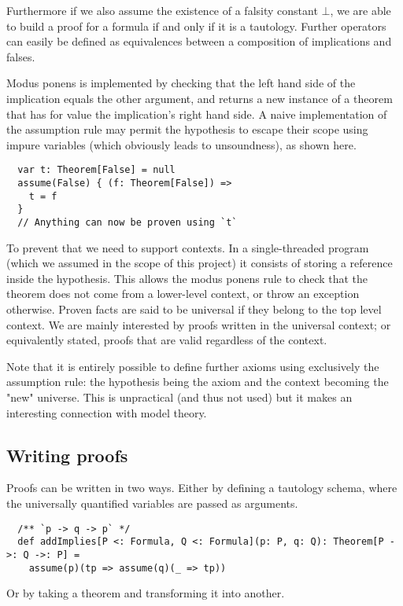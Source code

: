 \documentclass[acmlarge]{acmart}
\begin{document}
Furthermore if we also assume the existence of a falsity constant $\bot$, we are able to build a proof for a formula if and only if it is a tautology. Further operators can easily be defined as equivalences between a composition of implications and falses.

Modus ponens is implemented by checking that the left hand side of the implication equals the other argument, and returns a new instance of a theorem that has for value the implication's right hand side.
A naive implementation of the assumption rule may permit the hypothesis to escape their scope using impure variables (which obviously leads to unsoundness), as shown here.

\begin{verbatim}
  var t: Theorem[False] = null
  assume(False) { (f: Theorem[False]) =>
    t = f
  }
  // Anything can now be proven using `t`
\end{verbatim}

To prevent that we need to support contexts. In a single-threaded program (which we assumed in the scope of this project) it consists of storing a reference inside the hypothesis. This allows the modus ponens rule to check that the theorem does not come from a lower-level context, or throw an exception otherwise. Proven facts are said to be universal if they belong to the top level context. We are mainly interested by proofs written in the universal context; or equivalently stated, proofs that are valid regardless of the context.

Note that it is entirely possible to define further axioms using exclusively the assumption rule: the hypothesis being the axiom and the context becoming the "new" universe. This is unpractical (and thus not used) but it makes an interesting connection with model theory.

\subsection{Writing proofs}

Proofs can be written in two ways. Either by defining a tautology schema, where the universally quantified variables are passed as arguments.

\begin{verbatim}
  /** `p -> q -> p` */
  def addImplies[P <: Formula, Q <: Formula](p: P, q: Q): Theorem[P ->: Q ->: P] =
    assume(p)(tp => assume(q)(_ => tp))
\end{verbatim}

Or by taking a theorem and transforming it into another.
\end{document}
